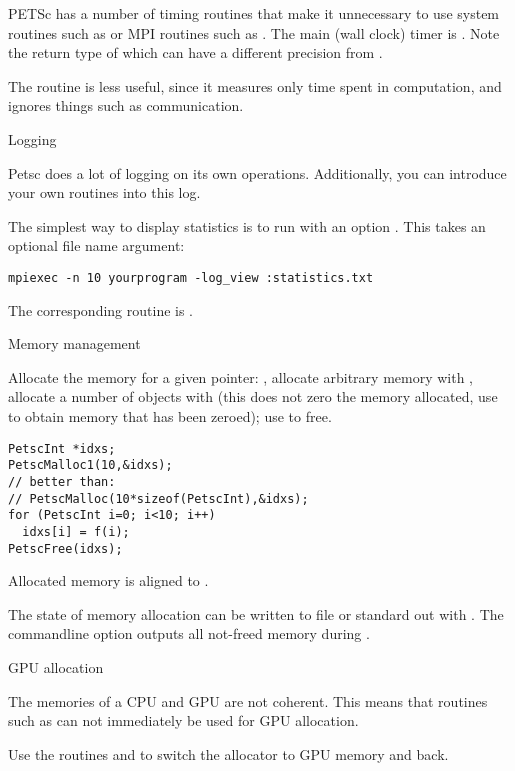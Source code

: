 PETSc has a number of timing routines that make it unnecessary to
use system routines such as 
or MPI routines such as .
The main (wall clock) timer is .
Note the return type of  which
can have a different precision from .

The routine  is less useful, since it measures only
time spent in computation, and ignores things such as communication.

 {Logging}

Petsc does a lot of logging on its own operations.
Additionally, you can introduce your own routines into this log.

The simplest way to display statistics is to run
with an option .
This takes an optional file name argument:
\begin{verbatim}
mpiexec -n 10 yourprogram -log_view :statistics.txt
\end{verbatim}
The corresponding routine is .

 {Memory management}
\label{sec:petscmalloc}

Allocate the memory for a given pointer: ,
allocate arbitrary memory with ,
allocate a number of objects with 
(this does not zero the memory allocated,
 use  to obtain memory that has been zeroed);
use  to free.
\begin{lstlisting}
PetscInt *idxs;
PetscMalloc1(10,&idxs);
// better than:
// PetscMalloc(10*sizeof(PetscInt),&idxs);
for (PetscInt i=0; i<10; i++)
  idxs[i] = f(i);
PetscFree(idxs);
\end{lstlisting}
Allocated memory is aligned to .

The state of memory allocation can be written to file or standard out
with . The commandline option
 outputs all not-freed memory during
.

 {GPU allocation}
\label{sec:petsc-malloc-gpu}

The memories of a CPU and GPU are not coherent.
This means that routines such as 
can not immediately be used for GPU allocation.

Use the routines 
and 
to switch the allocator to GPU memory and back.

